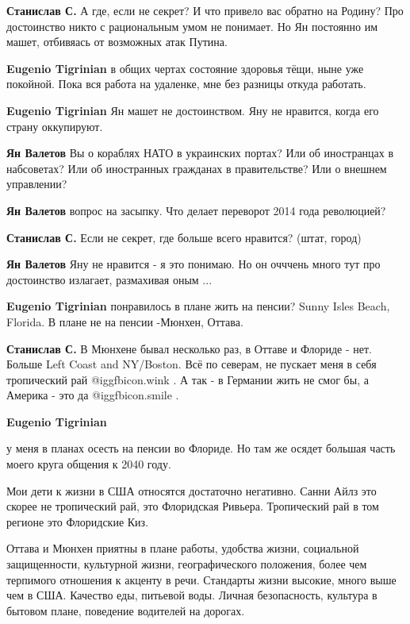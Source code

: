 \begin{itemize}
\begin{itemize}
\textbf{Станислав С.}
А где, если не секрет?
И что привело вас обратно на Родину?
Про достоинство никто с рациональным умом не понимает.
Но Ян постоянно им машет, отбивяась от возможных атак Путина.

\textbf{Eugenio Tigrinian} в общих чертах состояние здоровья тёщи, ныне уже покойной.
Пока вся работа на удаленке, мне без разницы откуда работать.

\textbf{Eugenio Tigrinian} Ян машет не достоинством. Яну не нравится, когда его страну оккупируют.

\textbf{Ян Валетов} Вы о кораблях НАТО в украинских портах? Или об иностранцах в набсоветах? Или об иностранных гражданах в правительстве? Или о внешнем управлении?

\textbf{Ян Валетов} вопрос на засыпку. Что делает переворот 2014 года революцией?

\textbf{Станислав С.}
Если не секрет, где больше всего нравится?
(штат, город)

\textbf{Ян Валетов}
Яну не нравится - я это понимаю.
Но он очччень много тут про достоинство излагает, размахивая оным ...

\textbf{Eugenio Tigrinian} понравилось в плане жить на пенсии? Sunny Isles Beach, Florida. В плане не на пенсии -Мюнхен, Оттава.

\textbf{Станислав С.}
В Мюнхене бывал несколько раз, в Оттаве и Флориде - нет.
Больше Left Coast and NY/Boston.
Всё по северам, не пускает меня в себя тропический рай  @igg{fbicon.wink} .
А так - в Германии жить не смог бы, а Америка - это да  @igg{fbicon.smile} .

\textbf{Eugenio Tigrinian} 

у меня в планах осесть на пенсии во Флориде. Но там же осядет большая часть
моего круга общения к 2040 году.

Мои дети к жизни в США относятся достаточно негативно.
Санни Айлз это скорее не тропический рай, это Флоридская Ривьера.
Тропический рай в том регионе это Флоридские Киз.

Оттава и Мюнхен приятны в плане работы, удобства жизни, социальной
защищенности, культурной жизни, географического положения, более чем терпимого
отношения к акценту в речи. Стандарты жизни высокие, много выше чем в США.
Качество еды, питьевой воды. Личная безопасность, культура в бытовом плане,
поведение водителей на дорогах.


\end{itemize}
\end{itemize}
